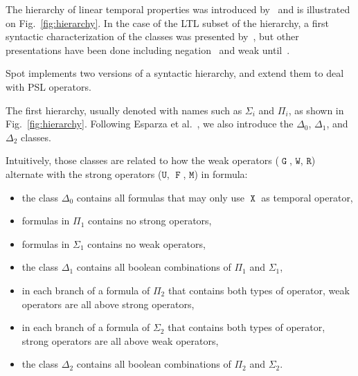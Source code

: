 \documentclass[a4paper,twoside,10pt,DIV=12]{scrreprt}
\DeclareMathOperator{\F}{\texttt{F}}
\DeclareMathOperator{\G}{\texttt{G}}
\newcommand{\U}{\mathbin{\texttt{U}}}
\newcommand{\R}{\mathbin{\texttt{R}}}
\DeclareMathOperator{\X}{\texttt{X}}
\newcommand{\M}{\mathbin{\texttt{M}}}
\newcommand{\W}{\mathbin{\texttt{W}}}
\newcommand{\0}{\texttt{0}}
\newcommand{\1}{\texttt{1}}
\begin{document}
\begin{figure}[tbp]
\begin{captionbeside}
  \end{captionbeside}
\end{figure}

The hierarchy of linear temporal properties was introduced
by~\citet{manna.87.podc} and is illustrated on
Fig.~\ref{fig:hierarchy}.  In the case of the LTL subset of the
hierarchy, a first syntactic characterization of the classes was
presented by~\citet{chang.92.icalp}, but other presentations have been
done including negation~\citep{cerna.03.mfcs} and weak
until~\citep{schneider.01.lpar}.

Spot implements two versions of a syntactic hierarchy, and extend them
to deal with PSL operators.


The first hierarchy, usually denoted with names such as $\Sigma_i$ and
$\Pi_i$, as shown in Fig.~\ref{fig:hierarchy}.  Following Esparza et
al.~\cite{esparza.24.acm}, we also introduce the $\Delta_0$,
$\Delta_1$, and $\Delta_2$ classes.

Intuitively, those classes are related to how the weak operators
($\G$, $\W$, $\R$) alternate with the strong operators ($\U$, $\F$,
$\M$) in formula:

\begin{itemize}
\item the class $\Delta_0$ contains all formulas that may only
  use $\X$ as temporal operator,
\item formulas in $\Pi_1$ contains no strong operators,
\item formulas in $\Sigma_1$ contains no weak operators,
\item the class $\Delta_1$ contains all boolean combinations of
  $\Pi_1$ and $\Sigma_1$,
\item in each branch of a formula of $\Pi_2$ that contains both types
  of operator, weak operators are all above strong operators,
\item in each branch of a formula of $\Sigma_2$ that contains both types
  of operator, strong operators are all above weak operators,
\item the class $\Delta_2$ contains all boolean combinations of
  $\Pi_2$ and $\Sigma_2$.
\end{itemize}
\end{document}
